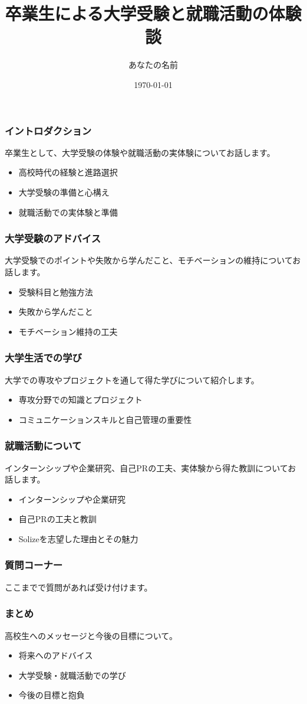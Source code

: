 \documentclass{beamer}
\title{卒業生による大学受験と就職活動の体験談}
\author{あなたの名前}
\date{\today}
\begin{document}
\frame{\titlepage}

\begin{frame}
    \frametitle{イントロダクション}
    卒業生として、大学受験の体験や就職活動の実体験についてお話します。
    \begin{itemize}
        \item 高校時代の経験と進路選択
        \item 大学受験の準備と心構え
        \item 就職活動での実体験と準備
    \end{itemize}
\end{frame}

\begin{frame}
    \frametitle{大学受験のアドバイス}
    大学受験でのポイントや失敗から学んだこと、モチベーションの維持についてお話します。
    \begin{itemize}
        \item 受験科目と勉強方法
        \item 失敗から学んだこと
        \item モチベーション維持の工夫
    \end{itemize}
\end{frame}

\begin{frame}
    \frametitle{大学生活での学び}
    大学での専攻やプロジェクトを通して得た学びについて紹介します。
    \begin{itemize}
        \item 専攻分野での知識とプロジェクト
        \item コミュニケーションスキルと自己管理の重要性
    \end{itemize}
\end{frame}

\begin{frame}
    \frametitle{就職活動について}
    インターンシップや企業研究、自己PRの工夫、実体験から得た教訓についてお話します。
    \begin{itemize}
        \item インターンシップや企業研究
        \item 自己PRの工夫と教訓
        \item Solizeを志望した理由とその魅力
    \end{itemize}
\end{frame}

\begin{frame}
    \frametitle{質問コーナー}
    ここまでで質問があれば受け付けます。
\end{frame}

\begin{frame}
    \frametitle{まとめ}
    高校生へのメッセージと今後の目標について。
    \begin{itemize}
        \item 将来へのアドバイス
        \item 大学受験・就職活動での学び
        \item 今後の目標と抱負
    \end{itemize}
\end{frame}
\end{document}

